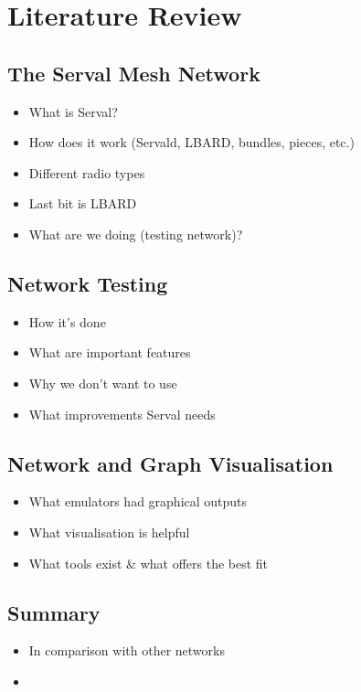 
\chapter{Literature Review} %

\label{Chapter2} %


\section{The Serval Mesh Network}
\begin{itemize}
    \item What is Serval?
    \item How does it work (Servald, LBARD, bundles, pieces, etc.)
    \item Different radio types
    \item Last bit is LBARD
    \item What are we doing (testing network)?
\end{itemize}


\section{Network Testing}
\begin{itemize}
    \item How it's done
    \item What are important features
    \item Why we don't want to use 
    \item What improvements Serval needs
\end{itemize}


\section{Network and Graph Visualisation}
\begin{itemize}
    \item What emulators had graphical outputs
    \item What visualisation is helpful
    \item What tools exist \& what offers the best fit
\end{itemize}


\section{Summary}
\begin{itemize}
    \item In comparison with other networks
    \item 
\end{itemize}
